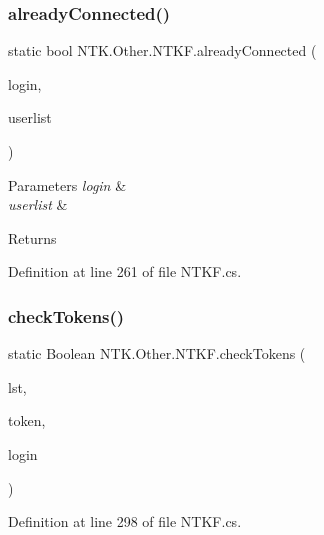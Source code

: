\subsubsection{\texorpdfstring{alreadyConnected()}{alreadyConnected()}}
{\footnotesize\ttfamily static bool N\+T\+K.\+Other.\+N\+T\+K\+F.\+already\+Connected (\begin{DoxyParamCaption}\item[{String}]{login,  }\item[{List$<$ \mbox{\hyperlink{class_n_t_k_1_1_n_t_k_user}{N\+T\+K\+User}} $>$}]{userlist }\end{DoxyParamCaption})\hspace{0.3cm}{\ttfamily [static]}}






\begin{DoxyParams}{Parameters}
{\em login} & \\
\hline
{\em userlist} & \\
\hline
\end{DoxyParams}
\begin{DoxyReturn}{Returns}

\end{DoxyReturn}


Definition at line 261 of file N\+T\+K\+F.\+cs.

\mbox{\label{class_n_t_k_1_1_other_1_1_n_t_k_f_ad0ca5d6482837544e492d82bc8b046b4}} 
\subsubsection{\texorpdfstring{checkTokens()}{checkTokens()}}
{\footnotesize\ttfamily static Boolean N\+T\+K.\+Other.\+N\+T\+K\+F.\+check\+Tokens (\begin{DoxyParamCaption}\item[{List$<$ \mbox{\hyperlink{class_n_t_k_1_1_other_1_1_token}{Token}} $>$}]{lst,  }\item[{String}]{token,  }\item[{ref String}]{login }\end{DoxyParamCaption})\hspace{0.3cm}{\ttfamily [static]}}



Definition at line 298 of file N\+T\+K\+F.\+cs.

